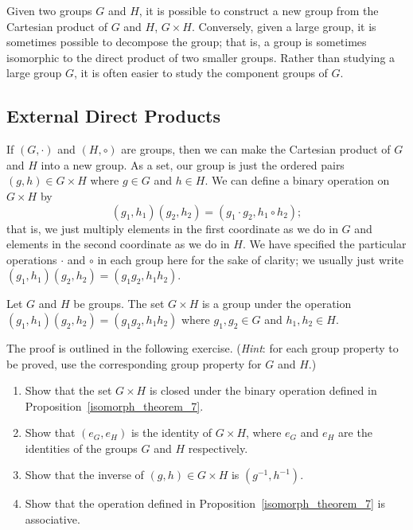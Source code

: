 Given two groups $G$ and $H$, it is possible to construct a new group from the Cartesian product of $G$ and $H$, $G \times H$.  Conversely, given a large group, it is sometimes possible to decompose the group; that is, a group is sometimes isomorphic to the direct product of two smaller groups.  Rather than studying a large group $G$, it is often easier to study the component groups of $G$. 
 
 
\subsection{External Direct Products}

If $(G,\cdot)$ and $(H, \circ)$ are groups, then we can make the Cartesian product of $G$ and $H$ into a new group.  As a set, our group is just the ordered pairs $(g, h) \in G \times H$ where $g \in G$ and $h \in H$. We can define a binary operation on $G \times H$ by 
\[
(g_1, h_1)(g_2, h_2) = (g_1 \cdot g_2, h_1 \circ h_2);
\]
that is, we just multiply elements in the first coordinate as we do in $G$ and elements in the second coordinate as we do in $H$.  We have specified the particular operations $\cdot$ and $\circ$ in each group here for the sake of clarity; we usually just write $(g_1, h_1)(g_2, h_2) = (g_1  g_2, h_1 h_2)$.  

\begin{thm}\label{isomorph_theorem_7}
Let $G$ and $H$ be groups. The set $G \times H$ is a group under the operation $(g_1, h_1)(g_2, h_2) = (g_1  g_2, h_1 h_2)$ where $g_1, g_2 \in G$ and $h_1, h_2 \in H$. 
\end{thm}
The proof is outlined in the following exercise. (\emph{Hint}: for each group property to be proved, use the corresponding group property for $G$ and $H$.)

\begin{exercise}\label{exercise:isomorph:proof_thm_7}
\begin{enumerate}
\item
Show that the set $G \times H$ is closed under the binary operation defined in Proposition~\ref{isomorph_theorem_7}. 
\item Show that $(e_G, e_H)$ is the identity of $G \times H$,
where $e_G$ and $e_H$ are the identities of the groups $G$ and $H$ respectively.
\item Show that the inverse of $(g, h) \in G \times H$ is $(g^{-1}, h^{-1})$.  
\item Show that the operation defined in Proposition~\ref{isomorph_theorem_7} is associative.
\end{enumerate}
\end{exercise}

